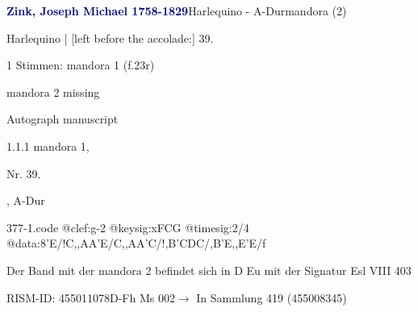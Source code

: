 \documentclass[twocolumn]{book}
\begin{document}
\par \vspace{7pt} \textcolor{darkblue}{\textbf{Zink, Joseph Michael  1758-1829}}\hfillplus{\textbf{[377]}}\newline Harlequino - A-Dur\newline mandora (2)
\par \begin{itshape}[f.23r, at left:] Harlequino | [left before the accolade:] 39.\end{itshape} 
\par \textcolor{darkblue}{}  1 Stimmen: mandora 1  (f.23r)\newline \begin{small} mandora 2 missing\end{small} \newline Autograph manuscript
\par 1.1.1  mandora 1, \begin{itshape}Nr. 39.\end{itshape}, A-Dur  
\begin{filecontents*}{377-1.code}
@clef:g-2
@keysig:xFCG
@timesig:2/4
@data:8'E/!C,,AA'E/C,,AA'C/!{,B'C}{DC}/,B'E,,E'E/f
\end{filecontents*}
\newline
%
\par Der Band mit der mandora 2 befindet sich in D Eu mit der Signatur Esl VIII 403
\par RISM-ID: 455011078\newline D-Fh  Ms 002\newline $\rightarrow$ In Sammlung 419 (455008345)
      
\end{document}
